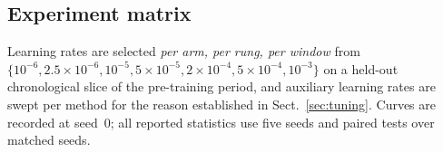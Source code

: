 \subsection{Experiment matrix}\label{app:matrix}

\begin{table}[h]
\caption{What the production run executes. Seeds replicate initialisation and shuffling only;
the data is identical across them}
\label{tab:spec-matrix}
\centering\small

\end{table}

Learning rates are selected \emph{per arm, per rung, per window} from
$\{10^{-6}, 2.5{\times}10^{-6}, 10^{-5}, 5{\times}10^{-5}, 2{\times}10^{-4}, 5{\times}10^{-4},
10^{-3}\}$ on a held-out chronological slice of the pre-training period, and auxiliary learning
rates are swept per method for the reason established in Sect.~\ref{sec:tuning}. Curves are
recorded at seed~0; all reported statistics use five seeds and paired tests over matched seeds.
